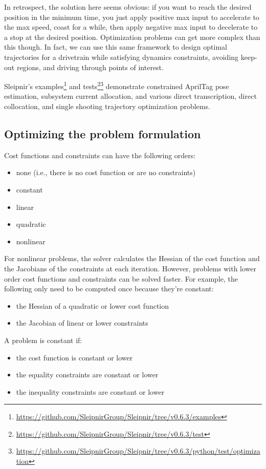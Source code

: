 In retrospect, the solution here seems obvious: if you want to reach the desired
position in the minimum time, you just apply positive max input to accelerate to
the max speed, coast for a while, then apply negative max input to decelerate to
a stop at the desired position. Optimization problems can get more complex than
this though. In fact, we can use this same framework to design optimal
trajectories for a drivetrain while satisfying dynamics constraints, avoiding
keep-out regions, and driving through points of interest.

Sleipnir's
examples\footnote{\url{https://github.com/SleipnirGroup/Sleipnir/tree/v0.6.3/examples}}
and
tests\footnote{\url{https://github.com/SleipnirGroup/Sleipnir/tree/v0.6.3/test}}\footnote{\url{https://github.com/SleipnirGroup/Sleipnir/tree/v0.6.3/python/test/optimization}}
demonstrate constrained AprilTag pose estimation, subsystem current allocation,
and various direct transcription, direct collocation, and single shooting
trajectory optimization problems.

\subsection{Optimizing the problem formulation}

Cost functions and constraints can have the following orders:
\begin{itemize}
  \item none (i.e., there is no cost function or are no constraints)
  \item constant
  \item linear
  \item quadratic
  \item nonlinear
\end{itemize}

For nonlinear problems, the solver calculates the Hessian of the cost function
and the Jacobians of the constraints at each iteration. However, problems with
lower order cost functions and constraints can be solved faster. For example,
the following only need to be computed once because they're constant:
\begin{itemize}
  \item the Hessian of a quadratic or lower cost function
  \item the Jacobian of linear or lower constraints
\end{itemize}

A problem is constant if:
\begin{itemize}
  \item the cost function is constant or lower
  \item the equality constraints are constant or lower
  \item the inequality constraints are constant or lower
\end{itemize}

